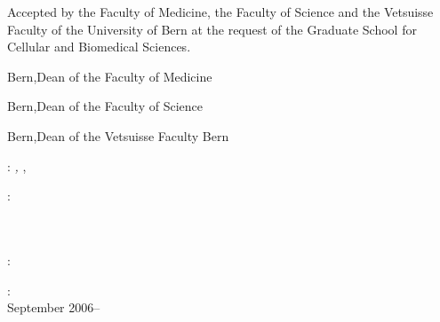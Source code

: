 \thispagestyle{empty}
\noindent Accepted by the Faculty of Medicine, the Faculty of Science and the Vetsuisse Faculty of the University of Bern at the request of the Graduate School for Cellular and Biomedical Sciences.

\vspace{2.5cm}
\noindent Bern,\hfill Dean of the Faculty of Medicine

\vspace{2.5cm}
\noindent Bern,\hfill Dean of the Faculty of Science

\vspace{2.5cm}
\noindent Bern,\hfill Dean of the Vetsuisse Faculty Bern\\
\vfill

\noindent\myName: \emph{\myTitle,} \myDegree, \myversion

\bigskip
\noindent{}:\\
\myProf \\
\myOtherProf \\ 
\mySupervisor

\medskip

\noindent{}:\\
\noindent\myLocation

\medskip
\noindent{}:\\
September 2006--\myTime
